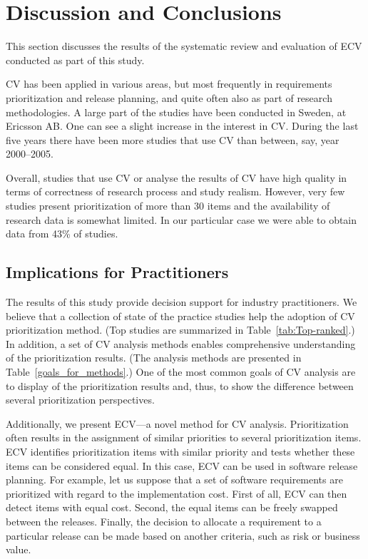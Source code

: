 
\section{Discussion and Conclusions\label{discussion}}

\parskip -5pt
This section discusses the results of the systematic review and evaluation of ECV conducted as part of this study.
\parskip 0pt

CV has been applied in various areas, but most frequently in requirements prioritization and release planning, and quite often also as part of research methodologies.
A large part of the studies have been conducted in Sweden, at Ericsson AB.%
One can see a slight increase in the interest in CV. During the last five years there have been more studies that use CV than between, say, year 2000--2005.

Overall, studies that use CV or analyse the results of CV have high quality in terms of correctness of research process and study realism.
However, very few studies present prioritization of more than 30 items and the availability of research data is somewhat limited. In our particular case we were able to obtain data from 43\% of studies.

\subsection{Implications for Practitioners}
The results of this study provide decision support for industry practitioners.
We believe that a collection of state of the practice studies help the adoption of CV prioritization method. (Top studies are summarized in Table~\ref{tab:Top-ranked}.)
In addition, a set of CV analysis methods enables comprehensive understanding of the prioritization results. 
(The analysis methods are presented in Table~\ref{goals_for_methods}.)
One of the most common goals of CV analysis are to display of the prioritization results and, thus, to show the difference between several prioritization perspectives.

Additionally, we present ECV---a novel method for CV analysis.
Prioritization often results in the assignment of similar priorities to several prioritization items.
ECV identifies prioritization items with similar priority and tests whether these items can be considered equal.
In this case, ECV can be used in software release planning. For example, let us suppose that a set of software requirements are prioritized with regard to the implementation cost.
First of all, ECV can then detect items with equal cost.
Second, the equal items can be freely swapped between the releases.
Finally, the decision to allocate a requirement to a particular release can be made based on another criteria, such as risk or business value.

